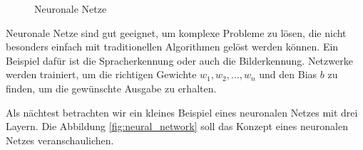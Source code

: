 \documentclass[11pt,a4paper]{article}
\begin{document}
\begin{figure}[h]
	\centering

	\caption{Neuronale Netze}
	\label{fig:neuron}

\end{figure}


\noindent
Neuronale Netze sind gut geeignet, um komplexe Probleme zu lösen, die nicht besonders einfach mit
traditionellen Algorithmen gelöst werden können. Ein Beispiel dafür ist die Spracherkennung oder
auch die Bilderkennung. Netzwerke werden trainiert, um die richtigen Gewichte
\(w_{1}, w_{2}, \dots, w_{n}\) und den Bias \(b\) zu finden, um die gewünschte Ausgabe zu erhalten.

\noindent \newline
Als nächtest betrachten wir ein kleines Beispiel eines neuronalen Netzes mit drei Layern.
Die Abbildung \ref{fig:neural_network} soll das Konzept eines neuronalen Netzes veranschaulichen.

\vspace{0.5cm}
\end{document}
